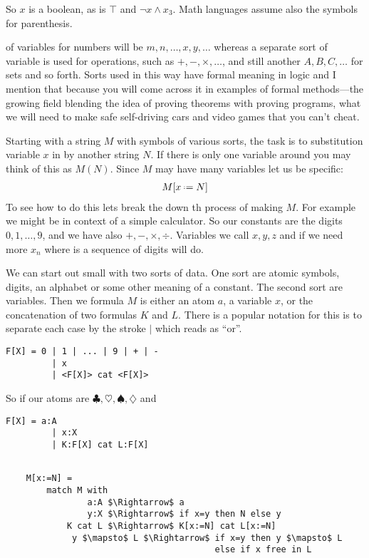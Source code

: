 So $x$ is a boolean, as is $\top$ and $\neg x\wedge x_3$.  Math languages assume 
also the symbols for parenthesis.

of variables for numbers will be $m,n,\ldots,
x,y,\ldots$ whereas a separate sort of variable is used for operations, such as
$+,-,\times,\ldots$, and still another $A,B,C,\ldots$ for sets and so forth.
Sorts used in this way have formal meaning in logic and I mention that because 
you will come across it in examples of formal methods---the growing field 
blending the idea of proving theorems with proving programs, what we will 
need to make safe self-driving cars and video games that you can't cheat.

Starting with a string $M$ with symbols of various sorts, the task is to 
substitution variable $x$ in by another string $N$.  If there is only one 
variable around you may think of this as $M(N)$.   Since $M$ may have many 
variables let us be specific:
\begin{align*}
    M[x\defeq N]
\end{align*}
To see how to do this lets break the down th process of making $M$.
For example we might be in context of a simple calculator.  So our constants 
are the digits $0,1,\ldots,9$, and we have also $+,-,\times,\div$.
Variables we call $x,y,z$ and if we need more $x_n$ where is a sequence 
of digits will do.


We can start out small with two sorts of data.  One 
sort are atomic symbols, digits, an alphabet or some other meaning 
of a constant.  The second sort are variables.  Then we formula 
$M$ is either an atom $a$, a variable $x$, or the concatenation 
of two formulas $K$ and $L$.  There is a popular notation for this 
is to separate each case by the stroke $\mid$ which reads as ``or''.
\begin{lstlisting}[language=Hidris,mathescape]
    F[X] = 0 | 1 | ... | 9 | + | -
         | x
         | <F[X]> cat <F[X]>
\end{lstlisting}

So if our atoms are $\clubsuit,\heartsuit, \spadesuit,\diamondsuit$
and 
\begin{lstlisting}[language=Hidris,mathescape]
    F[X] = a:A 
         | x:X
         | K:F[X] cat L:F[X]
\end{lstlisting}

\begin{lstlisting}[language=Hidris,mathescape]

    M[x:=N] =
        match M with 
                a:A $\Rightarrow$ a
                y:X $\Rightarrow$ if x=y then N else y
            K cat L $\Rightarrow$ K[x:=N] cat L[x:=N]
             y $\mapsto$ L $\Rightarrow$ if x=y then y $\mapsto$ L 
                                         else if x free in L 
    \end{lstlisting}
    

